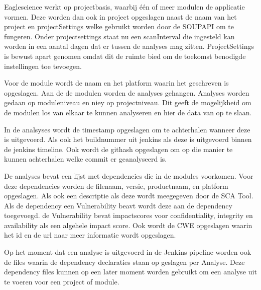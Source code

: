 Eaglescience werkt op projectbasis, waarbij één of meer modulen de applicatie vormen. Deze worden dan ook in project opgeslagen naast de naam van het project en projectSettings welke gebruikt worden door de SOUPAPI om te fungeren. Onder projectsettings staat nu een scanInterval die ingesteld kan worden in een aantal dagen dat er tussen de analyses mag zitten. ProjectSettings is bewust apart genomen omdat dit de ruimte bied om de toekomst benodigde instellingen toe tevoegen.

Voor de module wordt de naam en het platform waarin het geschreven is opgeslagen. Aan de de modulen worden de analyses gehangen. Analyses worden gedaan op moduleniveau en niey op projectniveau. Dit geeft de mogelijkheid om de modulen los van elkaar te kunnen analyseren en hier de data van op te slaan.

In de analsyses wordt de timestamp opgeslagen om te achterhalen wanneer deze is uitgevoerd. Als ook het buildnummer uit jenkins als deze is uitgevoerd binnen de jenkins timeline. Ook wordt de githash opgeslagen om op die manier te kunnen achterhalen welke commit er geanalyseerd is.

De analyses bevat een lijst met dependencies die in de modules voorkomen. Voor deze dependencies worden de filenaam, versie, productnaam, en platform opgeslagen. Als ook een descriptie als deze wordt meegegeven door de SCA Tool. Als de dependency een Vulnerability beavt wordt deze aan de dependency toegevoegd. de Vulnerability bevat impactscores voor confidentiality, integrity en availability als een algehele impact score. Ook wordt de CWE opgeslagen waarin het id en de url naar meer informatie wordt opgeslagen.

Op het moment dat een analyse is uitgevoerd in de Jenkins pipeline worden ook de files waarin de dependency declaraties staan op geslagen per Analyse. Deze dependency files kunnen op een later moment worden gebruikt om een analyse uit te voeren voor een project of module.

